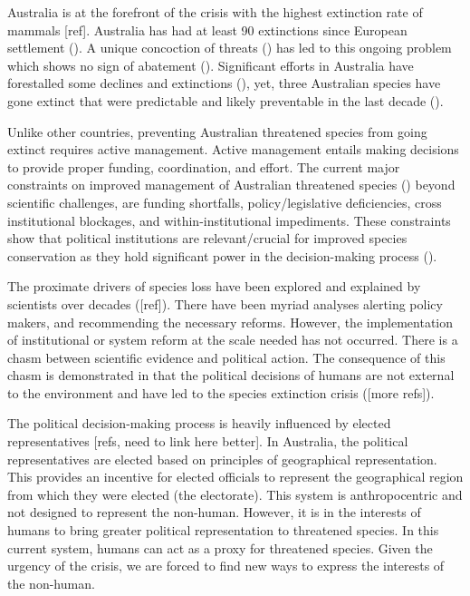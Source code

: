 \documentclass[a4paper,11pt]{article}
\begin{document}
Australia is at the forefront of the crisis with the highest extinction rate of mammals [ref]. Australia has had at least 90 extinctions since European settlement (\cite{commonwealthofaustraliaSpeciesProfileThreats2021}). A unique concoction of threats (\cite{kearneyThreatsAustraliaImperilled2019}) has led to this ongoing problem which shows no sign of abatement (\cite{simmondsVulnerableSpeciesEcosystems2020,wardLotsLossLittle2019,resideHowSendFinch2019}). Significant efforts in Australia have forestalled some declines and extinctions (\cite{kearneyThreatsAustraliaImperilled2019}), yet, three Australian species have gone extinct that were predictable and likely preventable in the last decade (\cite{woinarskiContributionPolicyLaw2017}).

Unlike other countries, preventing Australian threatened species from going extinct requires active management. Active management entails making decisions to provide proper funding, coordination, and effort. The current major constraints on improved management of Australian threatened species (\cite{leggeMonitoringThreatenedSpecies2018, wintleSpendingWhatWill2019, simmondsVulnerableSpeciesEcosystems2020,kearneyThreatsAustraliaImperilled2019,woinarskiReadingBlackBook2019,wardLotsLossLittle2019}) beyond scientific challenges, are funding shortfalls, policy/legislative deficiencies, cross institutional blockages, and within-institutional impediments. These constraints show that political institutions are relevant/crucial for improved species conservation as they hold significant power in the decision-making process (\cite{rydenLinkingDemocracyBiodiversity2020}).

The proximate drivers of species loss have been explored and explained by scientists over decades (\cite{rydenLinkingDemocracyBiodiversity2020}[ref]). There have been myriad analyses alerting policy makers, and recommending the necessary reforms. However, the implementation of institutional or system reform at the scale needed has not occurred. There is a chasm between scientific evidence and political action. The consequence of this chasm is demonstrated in that the political decisions of humans are not external to the environment and have led to the species extinction crisis (\cite{dalbyAnthropoceneFormationsEnvironmental2017a,burkeSpeciesBordersPolitical2020}[more refs]). 

The political decision-making process is heavily influenced by elected representatives [refs, need to link here better]. In Australia, the political representatives are elected based on principles of geographical representation. This provides an incentive for elected officials to represent the geographical region from which they were elected (the electorate). This system is anthropocentric and not designed to represent the non-human. However, it is in the interests of humans to bring greater political representation to threatened species. In this current system, humans can act as a proxy for threatened species. Given the urgency of the crisis, we are forced to find new ways to express the interests of the non-human.
\end{document}
